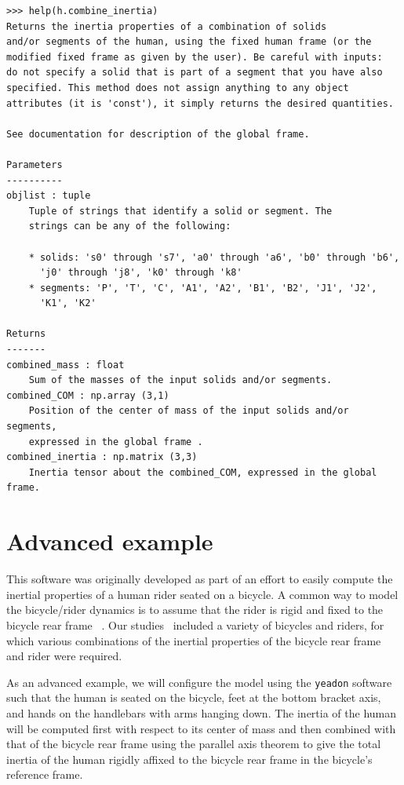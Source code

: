 \documentclass[10pt,a4paper,twocolumn]{article}
\begin{document}
\begin{listing*}
  \begin{verbatim}
>>> help(h.combine_inertia)
Returns the inertia properties of a combination of solids
and/or segments of the human, using the fixed human frame (or the
modified fixed frame as given by the user). Be careful with inputs:
do not specify a solid that is part of a segment that you have also
specified. This method does not assign anything to any object
attributes (it is 'const'), it simply returns the desired quantities.

See documentation for description of the global frame.

Parameters
----------
objlist : tuple
    Tuple of strings that identify a solid or segment. The
    strings can be any of the following:

    * solids: 's0' through 's7', 'a0' through 'a6', 'b0' through 'b6',
      'j0' through 'j8', 'k0' through 'k8'
    * segments: 'P', 'T', 'C', 'A1', 'A2', 'B1', 'B2', 'J1', 'J2',
      'K1', 'K2'

Returns
-------
combined_mass : float
    Sum of the masses of the input solids and/or segments.
combined_COM : np.array (3,1)
    Position of the center of mass of the input solids and/or segments,
    expressed in the global frame .
combined_inertia : np.matrix (3,3)
    Inertia tensor about the combined_COM, expressed in the global frame.
  \end{verbatim}
  \cprotect\caption{An example docstring for a method in the \verb+Human+
    class.}
  \label{lis:docstring}
\end{listing*}

\section*{Advanced example}
\label{sec:advanced-example}

This software was originally developed as part of an effort to easily compute
the inertial properties of a human rider seated on a bicycle. A common way to
model the bicycle/rider dynamics is to assume that the rider is rigid and fixed
to the bicycle rear frame ~\cite{Meijaard2007a}. Our studies~\cite{Moore2012}
included a variety of bicycles and riders, for which various combinations of
the inertial properties of the bicycle rear frame and rider were required.

As an advanced example, we will configure the model using the \verb+yeadon+
software such that the human is seated on the bicycle, feet at the bottom
bracket axis, and hands on the handlebars with arms hanging down. The inertia
of the human will be computed first with respect to its center of mass and then
combined with that of the bicycle rear frame  using the parallel axis theorem
to give the total inertia of the human rigidly affixed to the bicycle rear
frame in the bicycle's reference frame.
\end{document}
